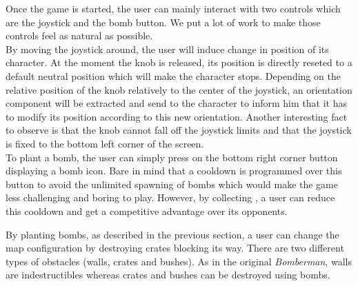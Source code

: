 



Once the game is started, the user can mainly interact with two controls which are the joystick and the bomb button. We put a lot of work to make those controls feel as natural as possible. \\

By moving the joystick around, the user will induce change in position of its character. At the moment the knob is released, its position is directly reseted to a default neutral position which will make the character stops. Depending on the relative position of the knob relatively to the center of the joystick, an orientation component will be extracted and send to the character to inform him that it has to modify its position according to this new orientation. Another interesting fact to observe is that the knob cannot fall off the joystick limits and that the joystick is fixed to the bottom left corner of the screen. \\

To plant a bomb, the user can simply press on the bottom right corner button displaying a bomb icon. Bare in mind that a cooldown is programmed over this button to avoid the unlimited spawning of bombs which would make the game less challenging and boring to play. However, by collecting , a user can reduce this cooldown and get a competitive advantage over its opponents.

By planting bombs, as described in the previous section, a user can change the map configuration by destroying crates blocking its way. There are two different types of obstacles (walls, crates and bushes). As in the original \textit{Bomberman}, walls are indestructibles whereas crates and bushes can be destroyed using bombs.

